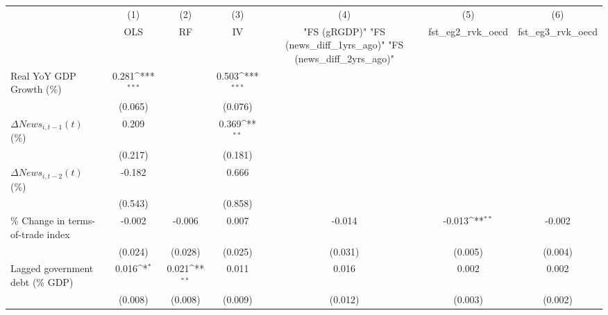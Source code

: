 {
\def\sym#1{\ifmmode^{#1}\else\(^{#1}\)\fi}
\begin{tabular}{l*{6}{c}}
\toprule
                    &\multicolumn{1}{c}{(1)}&\multicolumn{1}{c}{(2)}&\multicolumn{1}{c}{(3)}&\multicolumn{1}{c}{(4)}&\multicolumn{1}{c}{(5)}&\multicolumn{1}{c}{(6)}\\
                    &\multicolumn{1}{c}{OLS}&\multicolumn{1}{c}{RF}&\multicolumn{1}{c}{IV}&\multicolumn{1}{c}{ "FS (gRGDP)"  "FS (news_diff_1yrs_ago)"  "FS (news_diff_2yrs_ago)" }&\multicolumn{1}{c}{fst_eg2_rvk_oecd}&\multicolumn{1}{c}{fst_eg3_rvk_oecd}\\
\midrule
Real YoY GDP Growth (\%)&       0.281\sym{***}&                     &       0.503\sym{***}&                     &                     &                     \\
                    &     (0.065)         &                     &     (0.076)         &                     &                     &                     \\
\addlinespace
$ \Delta News_{i,t-1}(t)$ (\%)&       0.209         &                     &       0.369\sym{**} &                     &                     &                     \\
                    &     (0.217)         &                     &     (0.181)         &                     &                     &                     \\
\addlinespace
$ \Delta News_{i,t-2}(t)$ (\%)&      -0.182         &                     &       0.666         &                     &                     &                     \\
                    &     (0.543)         &                     &     (0.858)         &                     &                     &                     \\
\addlinespace
\% Change in terms-of-trade index&      -0.002         &      -0.006         &       0.007         &      -0.014         &      -0.013\sym{**} &      -0.002         \\
                    &     (0.024)         &     (0.028)         &     (0.025)         &     (0.031)         &     (0.005)         &     (0.004)         \\
\addlinespace
Lagged government debt (\% GDP)&       0.016\sym{*}  &       0.021\sym{**} &       0.011         &       0.016         &       0.002         &       0.002         \\
                    &     (0.008)         &     (0.008)         &     (0.009)         &     (0.012)         &     (0.003)         &     (0.002)         \\

\end{tabular}}
